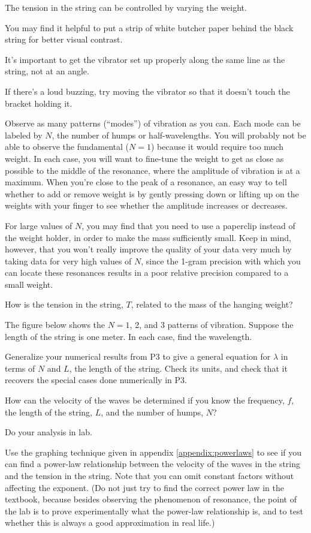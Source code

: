 The tension in the string
can be controlled by varying the weight.

You may find it helpful to put a strip of white butcher paper
behind the black string for better visual contrast.

It's important to get the vibrator set up properly along the
same line as the string, not at an angle.

If there's a loud buzzing, try moving the vibrator so that it doesn't
touch the bracket holding it.

\observations

Observe as many patterns (``modes'') of vibration as you can. Each mode
can be labeled by $N$, the number of humps or half-wavelengths.  You will
probably not be able to observe the fundamental ($N=1$)
because it would require too much weight.  In each
case, you will want to fine-tune the weight to get as close
as possible to the middle of the resonance, where the
amplitude of vibration is at a maximum.  When you're close
to the peak of a resonance, an easy way to tell whether to
add or remove weight is by gently pressing down or lifting
up on the weights with your finger to see whether the
amplitude increases or decreases.

For large values of $N$, you may find that you need to use a
paperclip instead of the weight holder, in order to make the mass
sufficiently small. Keep in mind, however, that you won't really
improve the quality of your data very much by taking data for very
high values of $N$, since the 1-gram precision with which you can
locate these resonances results in a poor relative precision
compared to a small weight.

\prelab

\prelabquestion  How is the tension in the string, $T$, related to the
mass of the hanging weight?

\prelabquestion The figure below shows the $N=1$, 2, and 3 patterns
of vibration. Suppose the length of the string is one meter. In each case,
find the wavelength.


\prelabquestion Generalize your numerical results from P3 to give a general
equation for $\lambda$ in terms of $N$ and $L$, the length of the string. Check its units, and check
that it recovers the special cases done numerically in P3.

\prelabquestion  How can the velocity of the waves be determined if you
know the frequency, $f$, the length of the string, $L$, and
the number of humps, $N$?

\selfcheck

Do your analysis in lab.

\analysis

Use the graphing technique given in appendix \ref{appendix:powerlaws} to see if you can
find a power-law relationship between the velocity of the
waves in the string and the tension in the string.  Note that you can omit
constant factors without affecting the exponent. (Do not
just try to find the correct power law in the textbook,
because besides observing the phenomenon of resonance, the
point of the lab is to prove experimentally what the
power-law relationship is, and to test whether this is
always a good approximation in real life.)
